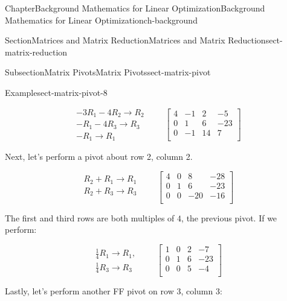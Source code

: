 \documentclass[oneside,10pt,]{book}
\numberwithin{equation}{section}
\newcommand{\amp}{&}
\begin{document}
\begin{chapterptx}{Chapter}{Background Mathematics for Linear Optimization}{}{Background Mathematics for Linear Optimization}{}{}{ch-background}
\begin{sectionptx}{Section}{Matrices and Matrix Reduction}{}{Matrices and Matrix Reduction}{}{}{sect-matrix-reduction}
\begin{subsectionptx}{Subsection}{Matrix Pivots}{}{Matrix Pivots}{}{}{sect-matrix-pivot}
\begin{example}{Example}{}{sect-matrix-pivot-8}
\par
%
\begin{equation*}
\begin{array}{r} -3R_1-4R_2 \to R_2 \\ -R_1-4R_3 \to R_3 \\ -R_1 \to R_1 \end{array} \qquad \left[\begin{array}{rrr|r} 4 \amp -1 \amp 2 \amp -5\\ 0 \amp 1 \amp 6 \amp -23\\ 0 \amp -1 \amp 14 \amp 7\\ \end{array} \right]
\end{equation*}
%
\par
Next, let's perform a pivot about row 2, column 2.%
\par
%
\begin{equation*}
\begin{array}{r} R_2 + R_1 \to R_1 \\ R_2 + R_3 \to R_3 \\ \end{array} \qquad \left[\begin{array}{rrr|r} 4 \amp 0 \amp 8 \amp -28\\ 0 \amp 1 \amp 6 \amp -23\\ 0 \amp 0 \amp -20 \amp -16\\ \end{array} \right]
\end{equation*}
%
\par
The first and third rows are both multiples of \(4\), the previous pivot. If we perform:%
\par
%
\begin{equation*}
\begin{array}{r} \frac{1}{4} R_1 \to R_1, \\ \frac{1}{4} R_3 \to R_3 \end{array} \qquad \left[\begin{array}{rrr|r} 1 \amp 0 \amp 2 \amp -7\\ 0 \amp 1 \amp 6 \amp -23\\ 0 \amp 0 \amp 5 \amp -4\\ \end{array} \right]
\end{equation*}
%
\par
Lastly, let's perform another FF pivot on row 3, column 3:%
\par
%
\begin{equation*}

\end{equation*}
\end{example}
\end{subsectionptx}
\end{sectionptx}
\end{chapterptx}
\end{document}
